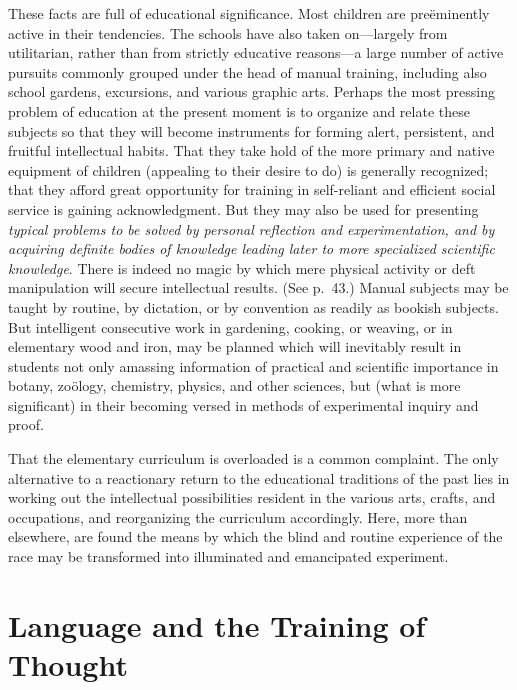 \documentclass[showtrims,ustradepaper]{memoir}
\begin{document}

These facts are full of educational significance. Most children are
preëminently active in their tendencies. The schools have also taken
on---largely from utilitarian, rather than from strictly educative
reasons---a large number of active pursuits commonly grouped under the
head of manual training, including also school gardens, excursions, and
various graphic arts. Perhaps the most pressing problem of education at
the present moment is to organize and relate these subjects so that they
will become instruments for forming alert, persistent, and fruitful
intellectual habits. That they take hold of the more primary and native
equipment of children (appealing to their desire to do) is generally
recognized; that they afford great opportunity for training in
self-reliant and efficient social service is gaining acknowledgment. But
they may also be used for presenting \emph{typical problems to be solved
by personal reflection and experimentation, and by acquiring definite
bodies of knowledge leading later to more specialized scientific
knowledge}. There is indeed no magic by which mere physical activity or
deft manipulation will secure intellectual results. (See p.\ 43.) Manual
subjects may be taught by routine, by dictation, or by convention as
readily
as bookish subjects. But intelligent consecutive work in gardening,
cooking, or weaving, or in elementary wood and iron, may be planned
which will inevitably result in students not only amassing information
of practical and scientific importance in botany, zoölogy, chemistry,
physics, and other sciences, but (what is more significant) in their
becoming versed in methods of experimental inquiry and proof.


That the elementary curriculum is overloaded is a common complaint. The
only alternative to a reactionary return to the educational traditions
of the past lies in working out the intellectual possibilities resident
in the various arts, crafts, and occupations, and reorganizing the
curriculum accordingly. Here, more than elsewhere, are found the means
by which the blind and routine experience of the race may be transformed
into illuminated and emancipated
experiment.

\chapter{Language and the Training of Thought}
\end{document}
